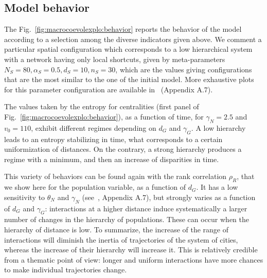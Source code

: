 \subsection{Model behavior}

The Fig.~\ref{fig:macrocoevolexplo:behavior} reports the behavior of the model according to a selection among the diverse indicators given above. We comment a particular spatial configuration which corresponds to a low hierarchical system with a network having only local shortcuts, given by meta-parameters $N_S=80,\alpha_S=0.5,d_S=10,n_S=30$, which are the values giving configurations that are the most similar to the one of the initial model. More exhaustive plots for this parameter configuration are available in~\cite{raimbault:tel-01857741} (Appendix A.7).


The values taken by the entropy for centralities (first panel of Fig.~\ref{fig:macrocoevolexplo:behavior}), as a function of time, for $\gamma_N = 2.5$ and $v_0 = 110$, exhibit different regimes depending on $d_G$ and $\gamma_G$. A low hierarchy leads to an entropy stabilizing in time, what corresponds to a certain uniformization of distances. On the contrary, a strong hierarchy produces a regime with a minimum, and then an increase of disparities in time.


This variety of behaviors can be found again with the rank correlation $\rho_R$, that we show here for the population variable, as a function of $d_G$. It has a low sensitivity to $\theta_N$ and $\gamma_N$ (see~\cite{raimbault:tel-01857741}, Appendix A.7), but strongly varies as a function of $d_G$ and $\gamma_G$: interactions at a higher distance induce systematically a larger number of changes in the hierarchy of populations. These can occur when the hierarchy of distance is low. To summarize, the increase of the range of interactions will diminish the inertia of trajectories of the system of cities, whereas the increase of their hierarchy will increase it. This is relatively credible from a thematic point of view: longer and uniform interactions have more chances to make individual trajectories change.




